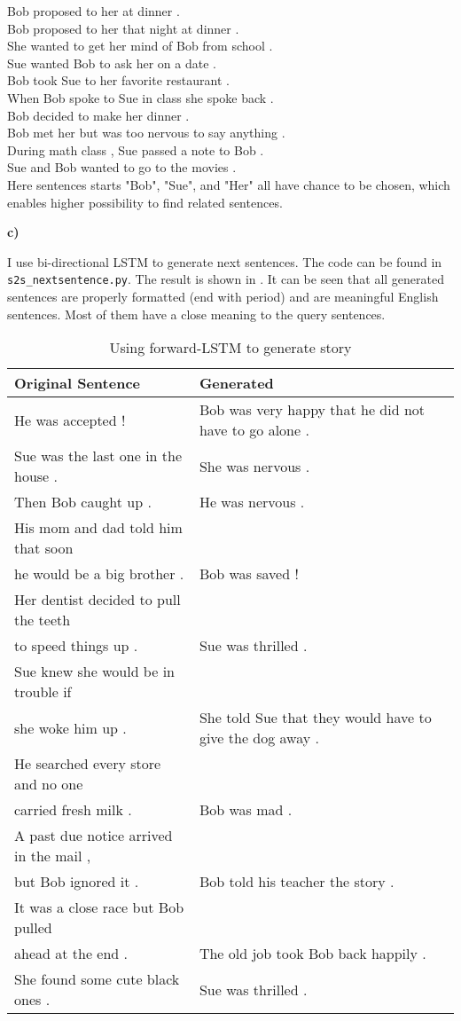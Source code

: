 \documentclass{article}
\begin{document}
Bob proposed to her at dinner . \\
Bob proposed to her that night at dinner . \\
She wanted to get her mind of Bob from school . \\
Sue wanted Bob to ask her on a date . \\
Bob took Sue to her favorite restaurant . \\
When Bob spoke to Sue in class she spoke back . \\
Bob decided to make her dinner . \\
Bob met her but was too nervous to say anything . \\
During math class , Sue passed a note to Bob . \\
Sue and Bob wanted to go to the movies . \\

Here sentences starts "Bob", "Sue", and "Her" all have chance to be chosen, which enables higher possibility to find related sentences.

\textbf{c)}

I use bi-directional LSTM to generate next sentences. The code can be found in \texttt{s2s\_nextsentence.py}. The result is shown in . It can be seen that all generated sentences are properly formatted (end with period) and are meaningful English sentences. Most of them have a close meaning to the query sentences.
\begin{table}
\begin{tabular}{l|l}
\textbf{Original Sentence} & \textbf{Generated} \\
\hline
He was accepted ! &  Bob was very happy that he did not have to go alone . \\
\hline
Sue was the last one in the house . & She was nervous . \\
\hline
Then Bob caught up . & He was nervous . \\
\hline
His mom and dad told him that soon\\ he would be a big brother . & Bob was saved ! \\
\hline
Her dentist decided to pull the teeth \\to speed things up . &Sue was thrilled . \\
\hline
Sue knew she would be in trouble if \\ she woke him up .  & She told Sue that they would have to give the dog away . \\
\hline
He searched every store and no one \\carried fresh milk . & Bob was mad .\\
\hline
A past due notice arrived in the mail , \\but Bob ignored it . & Bob told his teacher the story . \\
\hline
It was a close race but Bob pulled \\ahead at the end . &The old job took Bob back happily . \\
\hline
She found some cute black ones . & Sue was thrilled . \\
\end{tabular}
\caption{Using forward-LSTM to generate story}
\label{tab:gen}
\end{table}
\end{document}
